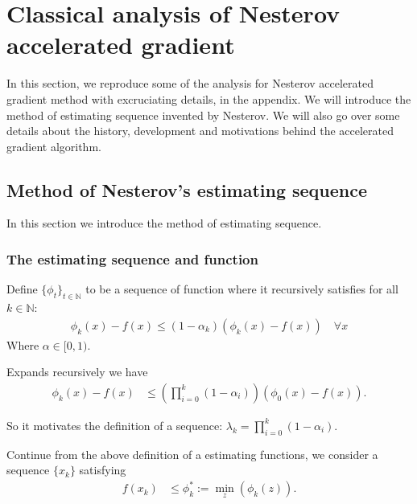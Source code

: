 \documentclass[12pt]{article}
\begin{document}
\section{Classical analysis of Nesterov accelerated gradient}
    In this section, we reproduce some of the analysis for Nesterov accelerated gradient method with excruciating details, in the appendix. 
    We will introduce the method of estimating sequence invented by Nesterov. 
    We will also go over some details about the history, development and motivations behind the accelerated gradient algorithm. 
    \subsection{Method of Nesterov's estimating sequence}
        In this section we introduce the method of estimating sequence. 

    \subsubsection{The estimating sequence and function}
        \begin{definition}
            Define  $\{\phi_t\}_{t\in \mathbb N}$ to be a sequence of function where it recursively satisfies for all $k\in \mathbb N$: 
            \begin{align*}
                \phi_{k} (x) - f(x) \le 
                (1 - \alpha_k)(\phi_k(x) - f(x)) \quad \forall x 
            \end{align*}
            Where $\alpha \in [0, 1)$. 
        \end{definition}
        \begin{observation}
            Expands recursively we have 
            \begin{align*}
                \phi_{k}(x) - f(x) &\le 
                \left(
                    \prod_{i = 0}^{k} 
                    (1 - \alpha_i)
                \right)(\phi_0(x) - f(x)). 
            \end{align*}
        \end{observation}
        So it motivates the definition of a sequence: $\lambda_k = \prod_{i=0}^k(1 - \alpha_i)$. 

        \begin{definition}
            Continue from the above definition of a estimating functions, we consider a sequence $\{x_k\}$ satisfying 
            \begin{align*}
                f(x_k) &\le \phi_k^* := \min_z(\phi_k(z)). 
            \end{align*}
        \end{definition}
        
\end{document}
